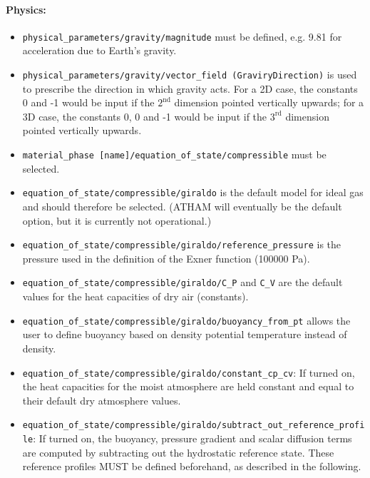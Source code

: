 \documentclass[10pt,a4paper]{article}
\begin{document}
\paragraph{Physics:}
\begin{itemize}
\item \texttt{physical\_parameters/gravity/magnitude} must be defined, e.g. 9.81 for acceleration due to Earth's gravity.
\item \texttt{physical\_parameters/gravity/vector\_field (GraviryDirection)} is used to prescribe the direction in which gravity acts. For a 2D case, the constants 0 and -1 would be input if the $2^{\mathrm{nd}}$ dimension pointed vertically upwards; for a 3D case, the constants 0, 0 and -1 would be input if the $3^{\mathrm{rd}}$ dimension pointed vertically upwards. 
\item \texttt{material\_phase [name]/equation\_of\_state/compressible} must be selected.
\item \texttt{equation\_of\_state/compressible/giraldo} is the default model for ideal gas and should therefore be selected. (ATHAM will eventually be the default option, but it is currently not operational.)
\item \texttt{equation\_of\_state/compressible/giraldo/reference\_pressure} is the pressure used in the definition of the Exner function (100000 Pa).
\item \texttt{equation\_of\_state/compressible/giraldo/C\_P} and \texttt{C\_V} are the default values for the heat capacities of dry air (constants).
\item \texttt{equation\_of\_state/compressible/giraldo/buoyancy\_from\_pt} allows the user to define buoyancy based on density potential temperature instead of density.
\item \texttt{equation\_of\_state/compressible/giraldo/constant\_cp\_cv}: If turned on, the heat capacities for the moist atmosphere are held constant and equal to their default dry atmosphere values.
\item \texttt{equation\_of\_state/compressible/giraldo/subtract\_out\_reference\_profile}: If turned on, the buoyancy, pressure gradient and scalar diffusion terms are computed by subtracting out the hydrostatic reference state. These reference profiles MUST be defined beforehand, as described in the following.
\end{itemize}
\end{document}
